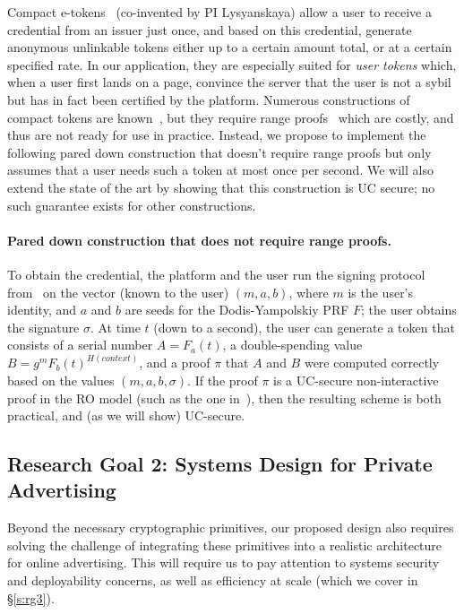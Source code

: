 Compact e-tokens~\cite{caholy05,chklm06} (co-invented by PI Lysyanskaya) allow a user to receive a credential from an issuer just once, and based on this credential, generate anonymous unlinkable tokens either up to a certain amount total, or at a certain specified rate.  In our application, they are especially suited for \emph{user tokens} which, when a user first lands on a page, convince the server that the user is not a sybil but has in fact been certified by the platform.  Numerous constructions of compact tokens are known~\cite{caholy05,chklm06,bckl09}, but they require range proofs~\cite{AC:CamChaShe08} which are costly, and thus are not ready for use in practice.  Instead, we propose to implement the following pared down construction that doesn't require range proofs but only assumes that a user needs such a token at most once per second.  We will also extend the state of the art by showing that this construction is UC secure; no such guarantee exists for other constructions.

\paragraph{Pared down construction that does not require range proofs.} To obtain the credential, the platform and the user run the signing protocol from~\cite{C:CamLys04} on the vector (known to the user) $(m,a,b)$, where $m$ is the user's identity, and $a$ and $b$ are seeds for the Dodis-Yampolskiy PRF $F$; the user obtains the signature $\sigma$.  At time $t$ (down to a second), the user can generate a token that consists of a serial number $A=F_a(t)$, a double-spending value $B = g^m F_b(t)^{H(\mathit{context})}$, and a proof $\pi$ that $A$ and $B$ were computed correctly based on the values $(m,a,b,\sigma)$. If the proof $\pi$ is a UC-secure non-interactive proof in the RO model (such as the one in~\cite{lysros22}), then the resulting scheme is both practical, and (as we will show) UC-secure.

\subsection{Research Goal 2: Systems Design for Private Advertising}
\label{s:rg2}

%
Beyond the necessary cryptographic primitives, our proposed design also requires solving the challenge of integrating these primitives into a realistic architecture for online advertising.
%
This will require us to pay attention to systems security and deployability concerns, as well as efficiency at scale (which we cover in \S\ref{s:rg3}).
%


